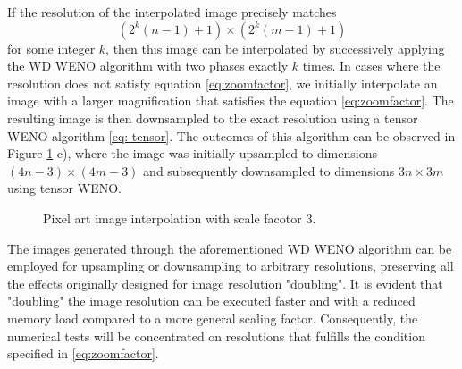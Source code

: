 If the resolution of the interpolated image precisely matches
\begin{equation}
	(2^k(n-1)+1)\times(2^k(m-1)+1)
	\label{eq:zoomfactor}
\end{equation}
for some integer $k$, then this image can be interpolated by successively applying the {WD} WENO algorithm with two phases exactly $k$ times. 
In cases where the resolution does not satisfy equation \eqref{eq:zoomfactor}, we initially interpolate an image with a larger magnification that satisfies the equation \eqref{eq:zoomfactor}. 
The resulting image is then downsampled to the exact resolution using a tensor WENO algorithm  \eqref{eq: tensor}. 
The outcomes of this algorithm can be observed in Figure \ref{fig: scale3} c), where the image was initially upsampled to dimensions $(4n-3)\times(4m-3)$ and subsequently downsampled to dimensions $3n\times3m$ using tensor WENO.

\begin{figure}
	\begin{center}
		{
		}			
		\caption{Pixel art image interpolation with scale facotor 3.}
		\label{fig: scale3}
	\end{center}
\end{figure}


The images generated through the aforementioned {WD} WENO algorithm can be employed for upsampling or downsampling to arbitrary resolutions, preserving all the  effects originally designed for image resolution "doubling". 
It is evident that "doubling" the image resolution can be executed faster and with a reduced memory load compared to a more general scaling factor. 
Consequently, the numerical tests will be concentrated on resolutions that fulfills the condition specified in \eqref{eq:zoomfactor}.

